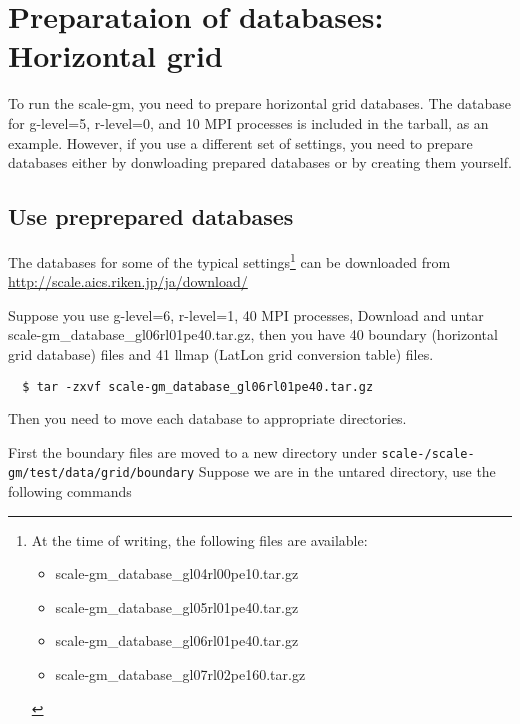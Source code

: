\section{Preparataion of databases: Horizontal grid}

To run the scale-gm, you need to prepare horizontal grid databases. 
The database for g-level=5, r-level=0, and 10 MPI processes 
is included in the tarball, as an example.
However, if you use a different set of settings, you need to prepare databases 
either by donwloading prepared databases or by creating them yourself.


\subsection{Use preprepared databases}
The databases for some of the typical settings\footnote{At the time of
  writing, the following files are available:
  \begin{itemize}
    \item scale-gm\_database\_gl04rl00pe10.tar.gz
    \item scale-gm\_database\_gl05rl01pe40.tar.gz
    \item scale-gm\_database\_gl06rl01pe40.tar.gz
    \item scale-gm\_database\_gl07rl02pe160.tar.gz
\end{itemize}} can be downloaded from \noindent \url{http://scale.aics.riken.jp/ja/download/}

Suppose you use g-level=6, r-level=1, 40 MPI processes, 
Download and untar scale-gm\_database\_gl06rl01pe40.tar.gz, 
 then you have 40 boundary (horizontal grid database)
files and 41 llmap (LatLon
grid conversion table) files. 
\begin{verbatim}
  $ tar -zxvf scale-gm_database_gl06rl01pe40.tar.gz
\end{verbatim}

\noindent Then you need to move each database to appropriate directories.

\noindent First the boundary files are moved to a new directory under 
\texttt{scale-{\version}/scale-gm/test/data/grid/boundary}
Suppose we are in the untared directory, use the following commands
\\

